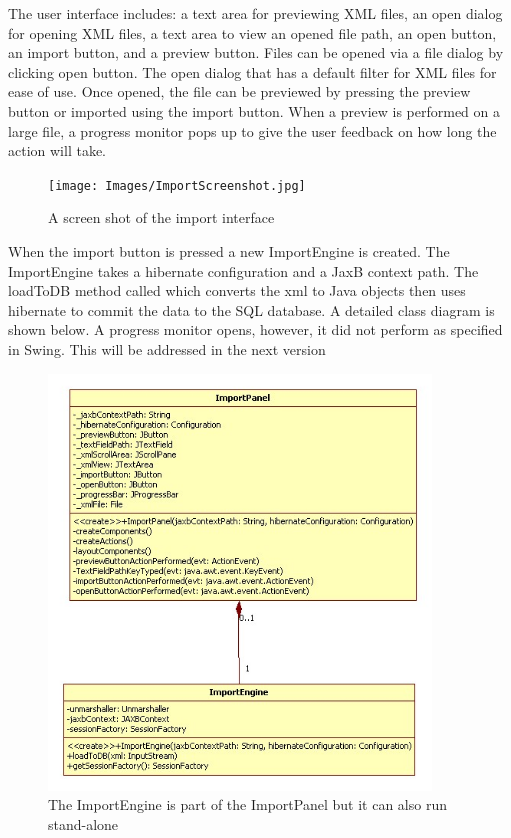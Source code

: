 \par
The user interface includes: a text area for previewing XML files, an open dialog for opening XML files, a text area to view an opened file path, an open button, an import button, and a preview button. Files can be opened via a file dialog by clicking open button. The open dialog that has a default filter for XML files for ease of use. Once opened, the file can be previewed by pressing the preview button or imported using the import button. When a preview is performed on a large file, a progress monitor pops up to give the user feedback on how long the action will take. 
\begin{figure}[h]
	\centering
		\texttt{[image: Images/ImportScreenshot.jpg]}
	\caption{A screen shot of the import interface}
	\label{fig:ImportScreenshot}
\end{figure}


\par	
When the import button is pressed a new ImportEngine is created. The ImportEngine takes a hibernate configuration and a JaxB context path. The loadToDB method called which converts the xml to Java objects then uses hibernate to commit the data to the SQL database. A detailed class diagram is shown below. A progress monitor opens, however, it did not perform as specified in Swing. This will be addressed in the next version

\begin{figure}[h]
	\centering
		\includegraphics[width=4.00in]{Images/ImportClasses.jpg}
	\caption{The ImportEngine is part of the ImportPanel but it can also run stand-alone}
	\label{fig:ImportClasses}
\end{figure}

